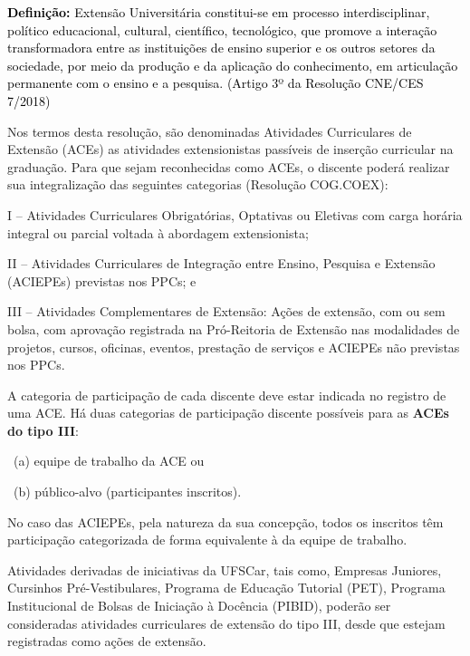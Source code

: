 \bigskip

\textbf{\textcolor{black}{Definição:}}\textcolor{black}{ Extensão Universitária constitui-se em processo
interdisciplinar, político educacional, cultural, científico, tecnológico, que promove a interação transformadora entre
as instituições de ensino superior e os outros setores da sociedade, por meio da produção e da aplicação do
conhecimento, em articulação permanente com o ensino e a pesquisa. (Artigo 3º da Resolução CNE/CES 7/2018)}


\bigskip

Nos termos desta resolução, são denominadas Atividades Curriculares de Extensão (ACEs) as atividades extensionistas
passíveis de inserção curricular na graduação. %
Para que sejam reconhecidas como ACEs, o discente poderá realizar sua integralização das seguintes categorias (Resolução
COG.COEX):

I – Atividades Curriculares Obrigatórias, Optativas ou Eletivas com carga horária integral ou parcial voltada à
abordagem extensionista;

II – Atividades Curriculares de Integração entre Ensino, Pesquisa e Extensão (ACIEPEs) %
previstas nos PPCs; e

III – Atividades Complementares de Extensão: Ações de extensão, com ou sem bolsa, com aprovação registrada na
Pró-Reitoria de Extensão nas modalidades de projetos, cursos, oficinas, eventos, prestação de serviços e %
ACIEPEs não previstas nos PPCs.


\bigskip

A categoria de participação de cada discente deve estar indicada no registro de uma ACE. Há duas categorias de
participação discente possíveis para as \textbf{ACEs do tipo III}:

\ (a) equipe de trabalho da ACE ou 

\ (b) público-alvo (participantes inscritos). 


\bigskip

No caso das ACIEPEs, pela natureza da sua concepção, todos os inscritos têm participação categorizada de forma
equivalente à da equipe de trabalho.


\bigskip

Atividades derivadas de iniciativas da UFSCar, tais como, Empresas Juniores, Cursinhos Pré-Vestibulares, Programa de
Educação Tutorial (PET), Programa Institucional de Bolsas de Iniciação à Docência (PIBID), poderão ser consideradas
atividades curriculares de extensão do tipo III, desde que estejam registradas como ações de extensão.


